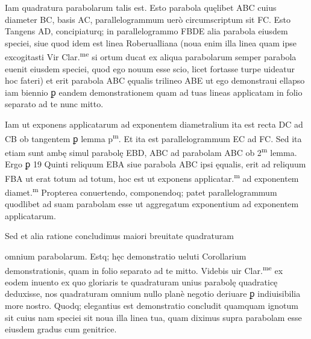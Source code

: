 \documentclass[11pt,a4paper]{article}
\begin{document}

Iam quadratura parabolarum talis est. Esto parabola quęlibet ABC cuius diameter BC, basis AC, parallelogrammum uerò circumscriptum sit FC. Esto Tangens AD, concipiaturq; in parallelogrammo FBDE alia parabola eiusdem speciei, siue quod idem est linea Roberualliana (noua enim illa linea quam ipse excogitasti Vir Clar.\textsuperscript{me} si ortum ducat ex aliqua parabolarum semper parabola euenit eiusdem speciei, quod ego nouum esse scio, licet fortasse turpe uideatur hoc fateri) et erit parabola ABC ęqualis trilineo ABE ut ego demonstraui ellapso iam biennio ꝑ eandem demonstrationem quam ad tuas lineas applicatam in folio separato ad te nunc mitto.

Iam ut exponens applicatarum ad exponentem diametralium ita est recta DC ad CB ob tangentem ꝑ lemma p\textsuperscript{m}. Et ita est parallelogrammum EC ad FC. Sed ita etiam sunt ambę simul parabolę EBD, ABC ad parabolam ABC ob 2\textsuperscript{m} lemma. Ergo ꝑ 19 Quinti reliquum EBA siue parabola ABC ipsi ęqualis, erit ad reliquum FBA ut erat totum ad totum, hoc est ut exponens applicatar.\textsuperscript{m} ad exponentem diamet.\textsuperscript{m} Propterea conuertendo, componendoq; patet parallelogrammum quodlibet ad suam parabolam esse ut aggregatum exponentium ad exponentem applicatarum.

Sed et alia ratione concludimus maiori breuitate quadraturam


omnium parabolarum. Estq; hęc demonstratio ueluti Corollarium demonstrationis, quam in folio separato ad te mitto. Videbis uir Clar.\textsuperscript{me} ex eodem inuento ex quo gloriaris te quadraturam unius parabolę quadraticę deduxisse, nos quadraturam omnium nullo planè negotio deriuare ꝑ indiuisibilia more nostro. Quodq; elegantius est demonstratio concludit quamquam ignotum sit cuius nam speciei sit noua illa linea tua, quam diximus supra parabolam esse eiusdem gradus cum genitrice.
\end{document}
